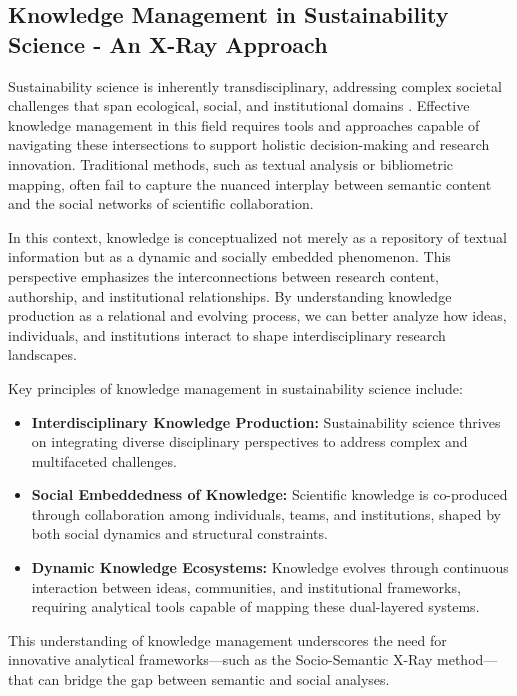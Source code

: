 \documentclass[12pt]{article}
\begin{document}
\subsection{Knowledge Management in Sustainability Science - An X-Ray Approach}
Sustainability science is inherently transdisciplinary, addressing complex societal challenges that span ecological, social, and institutional domains \cite{loorbach_sustainability_2017}. Effective knowledge management in this field requires tools and approaches capable of navigating these intersections to support holistic decision-making and research innovation. Traditional methods, such as textual analysis or bibliometric mapping, often fail to capture the nuanced interplay between semantic content and the social networks of scientific collaboration. 

In this context, knowledge is conceptualized not merely as a repository of textual information but as a dynamic and socially embedded phenomenon. This perspective emphasizes the interconnections between research content, authorship, and institutional relationships. By understanding knowledge production as a relational and evolving process, we can better analyze how ideas, individuals, and institutions interact to shape interdisciplinary research landscapes.

Key principles of knowledge management in sustainability science include:
\begin{itemize}
    \item \textbf{Interdisciplinary Knowledge Production:} Sustainability science thrives on integrating diverse disciplinary perspectives to address complex and multifaceted challenges.
    \item \textbf{Social Embeddedness of Knowledge:} Scientific knowledge is co-produced through collaboration among individuals, teams, and institutions, shaped by both social dynamics and structural constraints.
    \item \textbf{Dynamic Knowledge Ecosystems:} Knowledge evolves through continuous interaction between ideas, communities, and institutional frameworks, requiring analytical tools capable of mapping these dual-layered systems.
\end{itemize}

This understanding of knowledge management underscores the need for innovative analytical frameworks—such as the Socio-Semantic X-Ray method—that can bridge the gap between semantic and social analyses.
\end{document}

